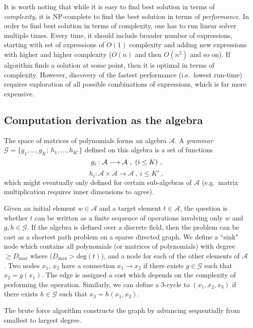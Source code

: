 It is worth noting that while it is easy to find best solution in
terms of {\em complexity}, it is NP-complete to find the best solution
in terms of {\em performance}. In order to find best solution in terms
of complexity, one has to run linear solver multiple times. Every
time, it should include broader number of expressions, starting with set
of expressions of $O(1)$ complexity and adding new expressions with higher and higher complexity
($O(n)$ and then $O(n^2)$ and so on). If algorithm finds a solution at
some point, then it is optimal in terms of complexity. 
However, discovery of the fastest performance (i.e.~lowest
run-time) requires exploration of all possible combinations of expressions,
which is far more expensive.  

\subsection{Computation derivation as the algebra}
The space of matrices of polynomials forms an algebra $\mathcal{A}$.
A \emph{grammar} $\mathcal{G}=\{g_1,\dots,g_{K};\, h_1,\dots, h_{K'}\}$ defined on this algebra is a set of functions
$$g_i : \mathcal{A} \longrightarrow \mathcal{A}~,~(i \leq K)~,\vspace{-3mm}$$
$$h_{i} : \mathcal{A} \times \mathcal{A} \longrightarrow \mathcal{A}~, ~i \leq K'~,$$
which might eventually only defined for certain sub-algebras of $\mathcal{A}$ 
(e.g.~matrix multiplication requires inner dimensions to agree). 

Given an initial element $w \in \mathcal{A}$ and a target element $t \in \mathcal{A}$, 
the question is whether $t$ can be written as a finite sequence of operations involving 
only $w$ and $g,h \in \mathcal{G}$.
If the algebra is defined over a discrete field, then the problem can be  
cast as a shortest path problem on a sparse directed graph. 
We define a ``sink" node which contains all polynomials (or matrices of polynomials) with degree $\geq D_{\max}$ 
where ($D_{\max} > \mbox{deg}(t)$), and a node for each of the other elements of $\mathcal{A}$. 
Two nodes $x_1,\,x_2$ have a connection $x_1 \rightarrow x_2$ if there exists $g \in \mathcal{G}$ such that
$x_2 = g(x_1)$. The edge is assigned a cost which depends on the complexity of performing the operation.   
Similarly, we can define a 3-cycle to $(x_1,x_2,x_3)$ if there exists $h \in \mathcal{G}$ such that $x_3 = h(x_1,x_2)$.

The brute force algorithm constructs the graph by advancing sequentially from smallest to largest degree. 


